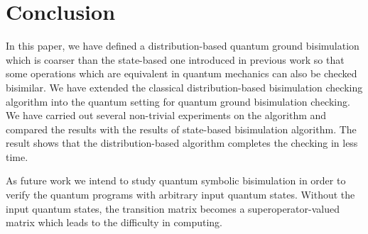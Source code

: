 \documentclass[runningheads]{llncs}
\begin{document}
\section{Conclusion}
\label{sec:conclusion}
In this paper, we have defined a distribution-based quantum ground bisimulation which is coarser than the state-based one introduced in previous work so that some operations which are equivalent in quantum mechanics can also be checked bisimilar. We have extended the classical distribution-based bisimulation checking algorithm into the quantum setting for quantum ground bisimulation checking. We have carried out several non-trivial experiments on the algorithm and compared the results with the results of state-based bisimulation algorithm. The result shows that the distribution-based algorithm completes the checking in less time.

As future work we intend to study quantum symbolic bisimulation in order to verify the quantum programs with arbitrary input quantum states. Without the input quantum states, the transition matrix becomes a superoperator-valued matrix which leads to the difficulty in computing.
%
%
%
% 
% 
%


\end{document}
